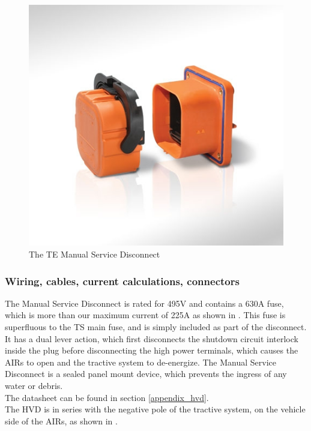 \documentclass{article}
\begin{document}
\begin{figure}[H]
\centering
\includegraphics[scale=.7]{TE_Manual_Service_Disconnect.jpg}
\caption{The TE Manual Service Disconnect}
\label{fig:TE_MSD}
\end{figure}

\subsubsection{Wiring, cables, current calculations, connectors}
The Manual Service Disconnect is rated for 495V and contains a 630A fuse, which is more than our maximum current of 225A as shown in . This fuse is superfluous to the TS main fuse, and is simply included as part of the disconnect.  It has a dual lever action, which first disconnects the shutdown circuit interlock inside the plug before disconnecting the high power terminals, which causes the AIRs to open and the tractive system to de-energize. The Manual Service Disconnect is a sealed panel mount device, which prevents the ingress of any water or debris. \\

The datasheet can be found in section \ref{appendix_hvd}.\\

The HVD is in series with the negative pole of the tractive system, on the vehicle side of the AIRs, as shown in . 
\end{document}
